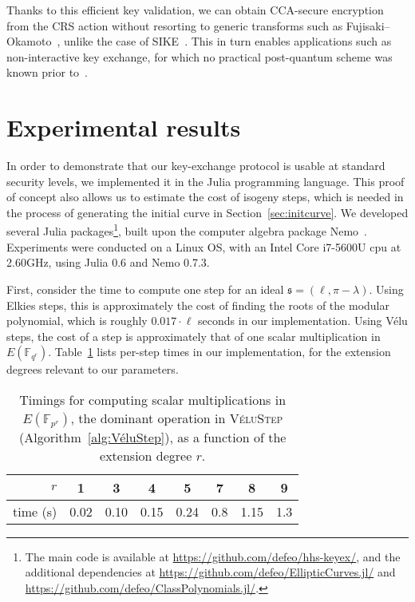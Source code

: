 \documentclass{llncs}
\newcommand{\F}{\mathbb{F}}
\newcommand{\algstyle}[1]{\textsc{#1}}
\renewcommand{\frak}{\mathfrak}
\begin{document}
Thanks to this efficient key validation, 
we can obtain CCA-secure encryption from the
CRS action without resorting to generic transforms such as
Fujisaki--Okamoto~\cite{10.1007/3-540-48405-1_34}, unlike the case of
SIKE~\cite{SIKE,10.1007/978-3-319-70500-2_12}. This in turn enables
applications such as non-interactive key exchange, for which no
practical post-quantum scheme was known prior to~\cite{csidh}.


\section{Experimental results}
\label{sec:exp}

In order to demonstrate that our key-exchange protocol is usable at
standard security levels, we implemented it in the Julia programming
language. This proof of concept also allows us to estimate the cost of
isogeny steps, which is needed in the process of generating the
initial curve in Section~\ref{sec:initcurve}.  We developed several
Julia packages\footnote{The main code is available at
  \url{https://github.com/defeo/hhs-keyex/}, and the additional
  dependencies at \url{https://github.com/defeo/EllipticCurves.jl/}
  and \url{https://github.com/defeo/ClassPolynomials.jl/}.}, built
upon the computer algebra package Nemo~\cite{nemo}.  Experiments were
conducted on a Linux OS, with an Intel Core i7-5600U cpu at 2.60GHz,
using Julia 0.6 and Nemo 0.7.3.

First, consider the
time to compute one step for an ideal $\frak s = (\ell,\pi-\lambda)$.
Using Elkies steps, this is approximately
the cost of finding the roots of the modular polynomial,
which is roughly $0.017\cdot\ell$ seconds in our implementation.
Using Vélu steps, the cost of a step is approximately
that of one scalar multiplication in $E(\F_{q^r})$.
Table~\ref{tab:time-vs-r} lists per-step times in our implementation,
for the extension degrees relevant to our parameters.

\begin{table}
    \centering
    \begin{tabular}{r@{\;}|@{\;}c@{\ \ }c@{\ \ }c@{\ \ }c@{\ \ }c@{\ \ }c@{\ \ }c}
        $r$ & 1 & 3 & 4 & 5 & 7 & 8 & 9 \\
        \hline
        time (s) & 0.02 & 0.10 & 0.15 & 0.24 & 0.8 & 1.15 & 1.3
    \end{tabular}
    \smallskip
    \caption{Timings for computing scalar multiplications in
    $E(\F_{p^r})$, the dominant operation in \algstyle{VéluStep}
    (Algorithm~\ref{alg:VéluStep}), as a function of the extension
    degree $r$.}
    \label{tab:time-vs-r}
\end{table}
\end{document}
